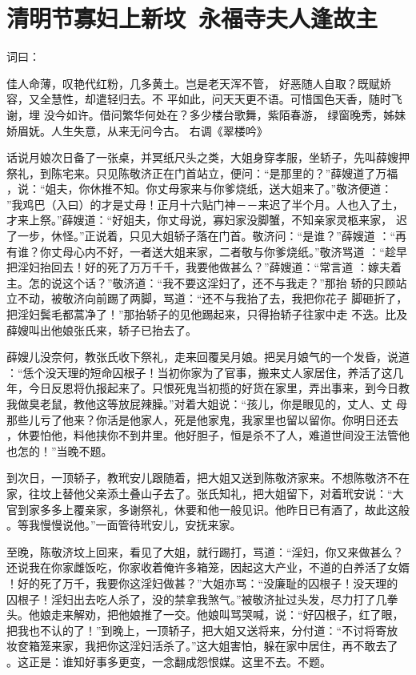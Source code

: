\chapter{清明节寡妇上新坟~永福寺夫人逢故主}

词曰：

佳人命薄，叹艳代红粉，几多黄土。岂是老天浑不管，
好恶随人自取？既赋娇容，又全慧性，却遣轻归去。不
平如此，问天天更不语。可惜国色天香，随时飞谢，埋
没今如许。借问繁华何处在？多少楼台歌舞，紫陌春游，
绿窗晚秀，姊妹娇眉妩。人生失意，从来无问今古。
右调《翠楼吟》

话说月娘次日备了一张桌，并冥纸尺头之类，大姐身穿孝服，坐轿子，先叫薛嫂押
祭礼，到陈宅来。只见陈敬济正在门首站立，便问：“是那里的？”薛嫂道了万福
，说：“姐夫，你休推不知。你丈母家来与你爹烧纸，送大姐来了。”敬济便道：
”我鸡巴（入曰）的才是丈母！正月十六贴门神－－来迟了半个月。人也入了土，
才来上祭。”薛嫂道：“好姐夫，你丈母说，寡妇家没脚蟹，不知亲家灵柩来家，
迟了一步，休怪。”正说着，只见大姐轿子落在门首。敬济问：“是谁？”薛嫂道
：“再有谁？你丈母心内不好，一者送大姐来家，二者敬与你爹烧纸。”敬济骂道
：“趁早把淫妇抬回去！好的死了万万千千，我要他做甚么？”薛嫂道：“常言道
：嫁夫着主。怎的说这个话？”敬济道：“我不要这淫妇了，还不与我走？”那抬
轿的只顾站立不动，被敬济向前踢了两脚，骂道：“还不与我抬了去，我把你花子
脚砸折了，把淫妇鬓毛都蒿净了！”那抬轿子的见他踢起来，只得抬轿子往家中走
不迭。比及薛嫂叫出他娘张氏来，轿子已抬去了。

薛嫂儿没奈何，教张氏收下祭礼，走来回覆吴月娘。把吴月娘气的一个发昏，说道
：“恁个没天理的短命囚根子！当初你家为了官事，搬来丈人家居住，养活了这几
年，今日反恩将仇报起来了。只恨死鬼当初揽的好货在家里，弄出事来，到今日教
我做臭老鼠，教他这等放屁辣臊。”对着大姐说：“孩儿，你是眼见的，丈人、丈
母那些儿亏了他来？你活是他家人，死是他家鬼，我家里也留以留你。你明日还去
，休要怕他，料他挟你不到井里。他好胆子，恒是杀不了人，难道世间没王法管他
也怎的！”当晚不题。

到次日，一顶轿子，教玳安儿跟随着，把大姐又送到陈敬济家来。不想陈敬济不在
家，往坟上替他父亲添土叠山子去了。张氏知礼，把大姐留下，对着玳安说：“大
官到家多多上覆亲家，多谢祭礼，休要和他一般见识。他昨日已有酒了，故此这般
。等我慢慢说他。”一面管待玳安儿，安抚来家。

至晚，陈敬济坟上回来，看见了大姐，就行踢打，骂道：“淫妇，你又来做甚么？
还说我在你家雌饭吃，你家收着俺许多箱笼，因起这大产业，不道的白养活了女婿
！好的死了万千，我要你这淫妇做甚？”大姐亦骂：“没廉耻的囚根子！没天理的
囚根子！淫妇出去吃人杀了，没的禁拿我煞气。”被敬济扯过头发，尽力打了几拳
头。他娘走来解劝，把他娘推了一交。他娘叫骂哭喊，说：“好囚根子，红了眼，
把我也不认的了！”到晚上，一顶轿子，把大姐又送将来，分付道：“不讨将寄放
妆奁箱笼来家，我把你这淫妇活杀了。”这大姐害怕，躲在家中居住，再不敢去了
。这正是：谁知好事多更变，一念翻成怨恨媒。这里不去。不题。

